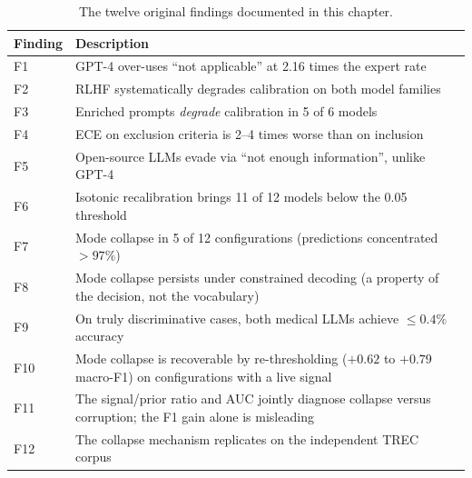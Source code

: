 \begin{table}[htbp]
    \centering
    \caption{The twelve original findings documented in this chapter.}
    \label{tab:res-summary-findings}
    \small
    \begin{tabular}{@{}lp{10cm}@{}}
        \toprule
        \textbf{Finding} & \textbf{Description} \\
        \midrule
        F1 & GPT-4 over-uses ``not applicable'' at 2.16 times the expert rate \\
        F2 & RLHF systematically degrades calibration on both model families \\
        F3 & Enriched prompts \emph{degrade} calibration in 5 of 6 models \\
        F4 & ECE on exclusion criteria is 2--4 times worse than on inclusion \\
        F5 & Open-source LLMs evade via ``not enough information'', unlike GPT-4 \\
        F6 & Isotonic recalibration brings 11 of 12 models below the 0.05 threshold \\
        F7 & Mode collapse in 5 of 12 configurations (predictions concentrated $>97\%$) \\
        F8 & Mode collapse persists under constrained decoding (a property of the decision, not the vocabulary) \\
        F9 & On truly discriminative cases, both medical LLMs achieve $\leq 0.4\%$ accuracy \\
        F10 & Mode collapse is recoverable by re-thresholding ($+0.62$ to $+0.79$ macro-F1) on configurations with a live signal \\
        F11 & The signal/prior ratio and AUC jointly diagnose collapse versus corruption; the F1 gain alone is misleading \\
        F12 & The collapse mechanism replicates on the independent TREC corpus \\
        \bottomrule
    \end{tabular}
\end{table}

